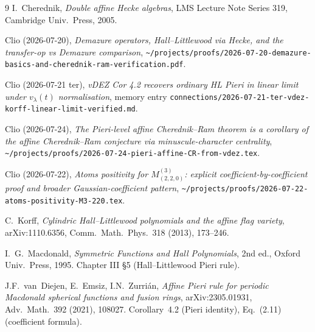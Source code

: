 \documentclass[11pt]{article}
\theoremstyle{definition}
\begin{document}
\begin{thebibliography}{9}
I.~Cherednik, \emph{Double affine Hecke algebras}, LMS Lecture Note Series 319,
Cambridge Univ.\ Press, 2005.

Clio (2026-07-20), \emph{Demazure operators, Hall--Littlewood via Hecke,
and the transfer-op vs Demazure comparison},
\verb|~/projects/proofs/2026-07-20-demazure-basics-and-cherednik-ram-verification.pdf|.

Clio (2026-07-21 ter), \emph{vDEZ Cor 4.2 recovers ordinary HL Pieri in linear
limit under $v_\lambda(t)$ normalisation},
memory entry \verb|connections/2026-07-21-ter-vdez-korff-linear-limit-verified.md|.

Clio (2026-07-24), \emph{The Pieri-level affine Cherednik--Ram theorem
is a corollary of the affine Cherednik--Ram conjecture via
minuscule-character centrality},
\verb|~/projects/proofs/2026-07-24-pieri-affine-CR-from-vdez.tex|.

Clio (2026-07-22), \emph{Atoms positivity for $M^{(3)}_{(2,2,0)}$: explicit
coefficient-by-coefficient proof and broader Gaussian-coefficient pattern},
\verb|~/projects/proofs/2026-07-22-atoms-positivity-M3-220.tex|.

C.~Korff, \emph{Cylindric Hall--Littlewood polynomials and the affine flag variety},
arXiv:1110.6356, Comm.\ Math.\ Phys.\ 318 (2013), 173--246.

I.~G.~Macdonald, \emph{Symmetric Functions and Hall Polynomials},
2nd ed., Oxford Univ.\ Press, 1995. Chapter III \S 5 (Hall--Littlewood
Pieri rule).

J.F.~van~Diejen, E.~Emsiz, I.N.~Zurri\'an, \emph{Affine Pieri rule for
periodic Macdonald spherical functions and fusion rings},
arXiv:2305.01931, Adv.\ Math.\ 392 (2021), 108027.
Corollary~4.2 (Pieri identity), Eq.~(2.11) (coefficient formula).
\end{thebibliography}
\end{document}
